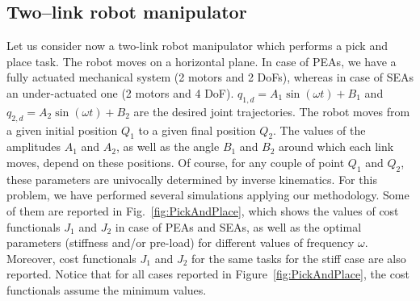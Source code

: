 \subsection{Two--link robot manipulator}

Let us consider now a two-link robot manipulator which performs a pick and place task. The robot moves on a horizontal plane.
% 
% 
In case of PEAs, we have a fully actuated mechanical system (2 motors and 2 DoFs), whereas in case of SEAs an under-actuated one (2 motors and 4 DoF). $q_{1,d}=A_1\sin(\omega t)+B_1$ and $q_{2,d}=A_2\sin(\omega t)+B_2$ are the desired joint trajectories. The robot moves from a given initial position $Q_1$ to a given final position $Q_2$. The values of the amplitudes $A_1$ and $A_2$, as well as the angle $B_1$ and $B_2$ around which each link moves, depend on these positions. Of course, for any couple of point $Q_1$ and $Q_2$, these parameters are univocally determined by inverse kinematics.
For this problem, we have performed several simulations applying our methodology. Some of them are reported in Fig.~\ref{fig:PickAndPlace}, which shows the values of cost functionals $J_1$ and $J_2$ in case of PEAs and SEAs, as well as the optimal parameters (stiffness and/or pre-load) for different values of frequency $\omega$. Moreover, cost functionals $J_1$ and $J_2$ for the same tasks for the stiff case are also reported. Notice that for all cases reported in Figure~\ref{fig:PickAndPlace}, the cost functionals assume the minimum values. %

